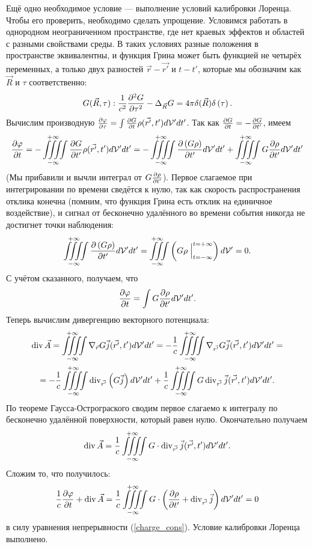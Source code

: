     Ещё одно необходимое условие --- выполнение условий калибровки Лоренца. Чтобы его проверить, необходимо сделать упрощение. Условимся работать
    в однородном неограниченном пространстве, где нет краевых эффектов и областей с разными свойствами среды. В таких условиях разные положения в
    пространстве эквивалентны, и функция Грина может быть функцией не четырёх переменных, а только двух разностей $\vec{r} - \vec{r'}$ и $t - t'$,
    которые мы обозначим как $\vec{R}$ и $\tau$ соответственно:
    \[
        G(\vec{R}, \tau) : \frac 1{c^2} \frac{\partial^2G}{\partial{\tau}^2} - \Delta_{\vec{R}}G = 4\pi\delta(\vec{R})\delta\left({\tau}\right).
    \]
    Вычислим производную $\frac{\partial\varphi}{\partial\tau} = \int \frac{\partial G}{\partial t}\rho(\vec{r'}, t')d\mathcal{V}'dt'$. Так как $\frac{\partial G}{\partial t} = -\frac{\partial G}{\partial t'}$, имеем
    \[
        \frac{\partial\varphi}{\partial t} = -\iiiint\limits_{-\infty}^{+\infty} \frac{\partial G}{\partial t'}\rho(\vec{r'}, t')d\mathcal{V}'dt' = 
        -\iiiint\limits_{-\infty}^{+\infty} \frac{\partial\left({G\rho}\right)}{\partial t'}d\mathcal{V}'dt' + \iiiint\limits_{-\infty}^{+\infty} G\frac{\partial\rho}{\partial t'}d\mathcal{V}'dt'
    \]
    (Мы прибавили и вычли интеграл от $G\frac{\partial\rho}{\partial t'}$). Первое слагаемое при интегрировании по времени сведётся к нулю, так как скорость
    распространения отклика конечна (помним, что функция Грина есть отклик на единичное воздействие), и сигнал от бесконечно удалённого во времени
    события никогда не достигнет точки наблюдения:
    \[
        \iiiint\limits_{-\infty}^{+\infty}\frac{\partial\left({G\rho}\right)}{\partial t'}d\mathcal{V}'dt' = 
        \iiint\limits_{-\infty}^{+\infty} \left({G\rho\Bigm|_{t=-\infty}^{t=+\infty}}\right)d\mathcal{V}' = 0.
    \]
    С учётом сказанного, получаем, что
    \[
        \frac{\partial\varphi}{\partial t} = \int G\frac{\partial\rho}{\partial t'}d\mathcal{V}'dt'.
    \]
    Теперь вычислим дивергенцию векторного потенциала:
    \begin{gather*}
        \operatorname{div}\vec{A} = \iiiint\limits_{-\infty}^{+\infty} \nabla_{\vec{r}} G \vec{j}(\vec{r'}, t')d\mathcal{V}'dt' =
        -\frac 1c \iiiint\limits_{-\infty}^{+\infty} \nabla_{\vec{r'}} G\vec{j}(\vec{r'}, t')d\mathcal{V}'dt' = \\ =
        -\frac 1c \iiiint\limits_{-\infty}^{+\infty} \operatorname{div}_{\vec{r'}}\left({G\vec{j}}\right)d\mathcal{V}'dt' + \frac{1}{c}\iiiint\limits_{-\infty}^{+\infty} G\operatorname{div}_{\vec{r'}}\vec{j}(\vec{r'}, t')d\mathcal{V}'dt'.
    \end{gather*}
    По теореме Гаусса-Острограского сводим первое слагаемо к интегралу по бесконечно удалённой поверхности, который равен нулю. 
    Окончательно получаем
    \[
        \operatorname{div}\vec{A} = \frac{1}{c}\iiiint\limits_{-\infty}^{+\infty} G\cdot\operatorname{div}_{\vec{r'}}\vec{j}(\vec{r'}, t')d\mathcal{V}'dt'.
    \]
    Сложим то, что получилось:
    \[
        \frac 1c \frac{\partial\varphi}{\partial t} + \operatorname{div}\vec{A} =
        \frac{1}{c}\iiiint\limits_{-\infty}^{+\infty} G\cdot\left({\frac{\partial\rho}{\partial t'} + \operatorname{div}_{\vec{r'}}\vec{j}}\right)d\mathcal{V}'dt' = 0
    \]
    в силу уравнения непрерывности (\ref{charge_cons}). Условие калибровки Лоренца выполнено.

